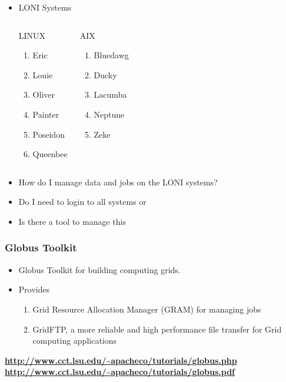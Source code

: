 \documentclass[slidestop,mathserif,compress,xcolor=svgnames]{beamer}
\begin{document}
\begin{frame}
\begin{itemize}
\item LONI Systems

\begin{columns}
\column{4cm}
\begin{block}{LINUX}
\begin{enumerate}
\item Eric
\item Louie
\item Oliver
\item Painter
\item Poseidon
\item Queenbee
\end{enumerate}
\end{block}
\column{4cm}
\begin{block}{AIX}
\begin{enumerate}
\item Bluedawg
\item Ducky
\item Lacumba
\item Neptune
\item Zeke
\end{enumerate}
\end{block}
\end{columns}
\item How do I manage data and jobs on the LONI systems?
\item Do I need to login to all systems or
\item Is there a tool to manage this
\end{itemize}
\end{frame}

\begin{frame}[fragile]
\frametitle{{\small Globus Toolkit}}
\begin{block}{}
\begin{itemize}
\item Globus Toolkit for building computing grids.
\item Provides 
\begin{enumerate}
\item Grid Resource Allocation Manager (GRAM) for managing jobs
\item GridFTP, a more reliable and high performance file transfer for Grid computing applications
\end{enumerate}
\end{itemize}
\end{block}

\begin{exampleblock}{}
\footnotesize{\bf
\url{http://www.cct.lsu.edu/~apacheco/tutorials/globus.php}\\
\url{http://www.cct.lsu.edu/~apacheco/tutorials/globus.pdf}}
\end{exampleblock}
\end{frame}
\end{document}
